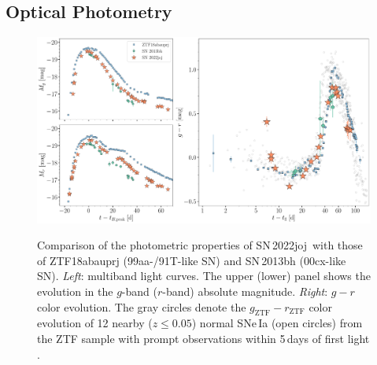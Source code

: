 \documentclass[twocolumn]{aastex631}
\newcommand{\sn}{SN\,2022joj}
\begin{document}
\begin{CJK*}{UTF8}{gbsn}
\subsection{Optical Photometry}
\begin{figure}
    \centering
    \includegraphics[width=\textwidth]{photometry.pdf}
    \label{fig:lc}
    \caption{Comparison of the photometric properties of \sn\ with those of ZTF18abauprj (99aa-/91T-like SN) and SN\,2013bh (00cx-like SN). \textit{Left}: multiband light curves. The upper (lower) panel shows the evolution in the $g$-band ($r$-band) absolute magnitude. %
    \textit{Right}: $g-r$ color evolution. %
    The gray circles denote the $g_\mathrm{ZTF}-r_\mathrm{ZTF}$ color evolution of 12 nearby ($z\le0.05$) normal SNe\,Ia (open circles) from the ZTF sample with prompt observations within 5\,days of first light \citep{Bulla2020}.}
\end{figure}

\end{CJK*}
\end{document}
